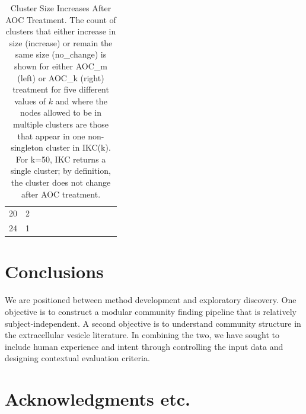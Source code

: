 \documentclass[12pt, oneside]{article}   	%
\begin{document}
\begin{table}
{\begin{tabular}{clllllllllll}
20 &   2 &  &  &  &  &  &  &  &  &  \\ 
24 &   1 &  &  &  &  &  &  &  &  &  \\ 
   \hline
\end{tabular}}
\caption{Cluster Size Increases After AOC Treatment. The count of clusters that either increase in size (increase) or remain the same size (no\_change) is shown
for either AOC\_m (left) or AOC\_k (right) treatment for five different values of $k$ and where the nodes allowed to be in multiple clusters are those that appear in one non-singleton cluster in IKC(k). 
 For k=50, IKC returns a single cluster; by definition, the cluster does not change after AOC treatment.}
\label{tab:tab2}
\end{table}

\clearpage

\section{Conclusions} We are positioned between method development and exploratory discovery. One objective is to construct a modular community finding pipeline that is relatively subject-independent. A second objective is to understand community structure in the extracellular vesicle literature. In combining the two, we have sought to include human experience and intent \citep{vonluxburg2012clustering} through controlling the input data and designing contextual evaluation criteria.

\section{Acknowledgments etc.}



\end{document}
